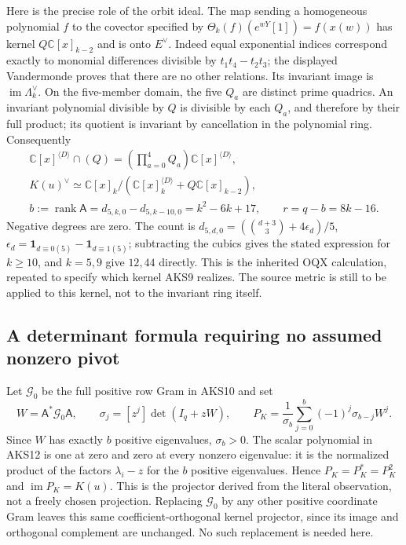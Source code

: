 Here is the precise role of the orbit ideal. The map sending a homogeneous
polynomial $f$ to the covector specified by
$\Theta_k(f)(e^{wY}[1])=f(x(w))$ has kernel
$Q\mathbb C[x]_{k-2}$ and is onto $E^\vee$. Indeed equal exponential
indices correspond exactly to monomial differences divisible by
$t_1t_4-t_2t_3$; the displayed Vandermonde proves that there are no other
relations. Its invariant image is $\operatorname{im}\Lambda_k^\vee$.
On the five-member domain, the five $Q_a$ are distinct prime quadrics.
An invariant polynomial divisible by $Q$ is divisible by each $Q_a$,
and therefore by their full product; its quotient is invariant by
cancellation in the polynomial ring. Consequently
\[
\begin{gathered}
 \mathbb C[x]^{\langle D\rangle}\cap (Q)
       =\left(\prod_{a=0}^4Q_a\right)\mathbb C[x]^{\langle D\rangle},\\
 K(u)^\vee\simeq
 \mathbb C[x]_k\big/(\mathbb C[x]_k^{\langle D\rangle}
                              +Q\mathbb C[x]_{k-2}),\\
 b:=\operatorname{rank}\mathsf A
     =d_{5,k,0}-d_{5,k-10,0}=k^2-6k+17,\qquad r=q-b=8k-16.
\end{gathered}\tag{AKS11}
\]
Negative degrees are zero. The count is
$d_{5,d,0}=(\binom{d+3}{3}+4\epsilon_d)/5$,
$\epsilon_d=\mathbf1_{d\equiv0(5)}-\mathbf1_{d\equiv1(5)}$;
subtracting the cubics gives the stated expression for $k\ge10$, and
$k=5,9$ give $12,44$ directly. This is the inherited OQX calculation,
repeated to specify which kernel AKS9 realizes. The source metric is
still to be applied to this kernel, not to the invariant ring itself.

\subsection{A determinant formula requiring no assumed nonzero pivot}
Let $\mathcal G_0$ be the full positive row Gram in AKS10 and set
\[
 W=\mathsf A^*\mathcal G_0\mathsf A,\qquad
 \sigma_j=[z^j]\det(I_q+zW),\qquad
 P_K=\frac1{\sigma_b}\sum_{j=0}^b(-1)^j\sigma_{b-j}W^j.
 \tag{AKS12}
\]
Since $W$ has exactly $b$ positive eigenvalues, $\sigma_b>0$. The scalar
polynomial in AKS12 is one at zero and zero at every nonzero eigenvalue:
it is the normalized product of the factors $\lambda_i-z$ for the $b$
positive eigenvalues. Hence $P_K=P_K^*=P_K^2$ and
$\operatorname{im}P_K=K(u)$. This is the projector derived from the
literal observation, not a freely chosen projection. Replacing
$\mathcal G_0$ by any other positive coordinate Gram leaves this same
coefficient-orthogonal kernel projector, since its image and orthogonal
complement are unchanged. No such replacement is needed here.

